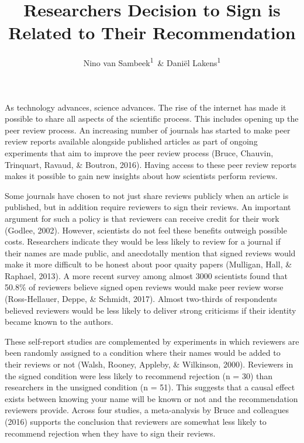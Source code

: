 \documentclass[,jou, a4paper,floatsintext]{apa6}
\title{Researchers Decision to Sign is Related to Their Recommendation}
\author{Nino van Sambeek\textsuperscript{1}~\& Daniël Lakens\textsuperscript{1}}
\date{}
\affiliation{
\vspace{0.5cm}
\textsuperscript{1} Eindhoven University of Technology, The Netherlands}
\begin{document}
\maketitle

As technology advances, science advances. The rise of the internet has made it possible to share all aspects of the scientific process. This includes opening up the peer review process. An increasing number of journals has started to make peer review reports available alongside published articles as part of ongoing experiments that aim to improve the peer review process (Bruce, Chauvin, Trinquart, Ravaud, \& Boutron, 2016). Having access to these peer review reports makes it possible to gain new insights about how scientists perform reviews.

Some journals have chosen to not just share reviews publicly when an article is published, but in addition require reviewers to sign their reviews. An important argument for such a policy is that reviewers can receive credit for their work (Godlee, 2002). However, scientists do not feel these benefits outweigh possible costs. Researchers indicate they would be less likely to review for a journal if their names are made public, and anecdotally mention that signed reviews would make it more difficult to be honest about poor quaity papers (Mulligan, Hall, \& Raphael, 2013). A more recent survey among almost 3000 scientists found that 50.8\% of reviewers believe signed open reviews would make peer review worse (Ross-Hellauer, Deppe, \& Schmidt, 2017). Almost two-thirds of respondents believed reviewers would be less likely to deliver strong criticisms if their identity became known to the authors.

These self-report studies are complemented by experiments in which reviewers are been randomly assigned to a condition where their names would be added to their reviews or not (Walsh, Rooney, Appleby, \& Wilkinson, 2000). Reviewers in the signed condition were less likely to recommend rejection (n = 30) than researchers in the unsigned condition (n = 51). This suggests that a causal effect exists between knowing your name will be known or not and the recommendation reviewers provide. Across four studies, a meta-analysis by Bruce and colleagues (2016) supports the conclusion that reviewers are somewhat less likely to recommend rejection when they have to sign their reviews.
\end{document}
